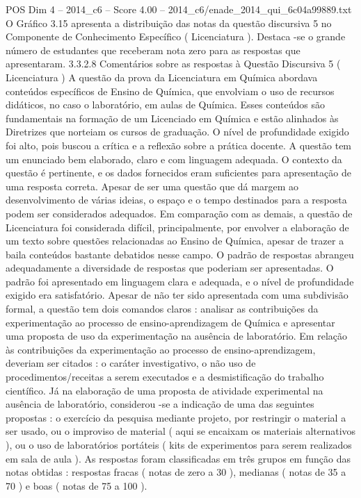 \begin{textsample}{POS Dim 4 – 2014\_c6 – Score 4.00 – 2014\_c6/enade\_2014\_qui\_6c04a99889.txt}
O Gráfico 3.15 apresenta a distribuição das notas da questão discursiva 5 no Componente de Conhecimento Específico ( Licenciatura ).
Destaca -se o grande número de estudantes que receberam nota zero para as respostas que apresentaram. 3.3.2.8 Comentários sobre as respostas à Questão Discursiva 5 ( Licenciatura ) A questão da prova da Licenciatura em Química abordava conteúdos específicos de Ensino de Química, que envolviam o uso de recursos didáticos, no caso o laboratório, em aulas de Química.
Esses conteúdos são fundamentais na formação de um Licenciado em Química e estão alinhados às Diretrizes que norteiam os cursos de graduação.
O nível de profundidade exigido foi alto, pois buscou a crítica e a reflexão sobre a prática docente.
A questão tem um enunciado bem elaborado, claro e com linguagem adequada.
O contexto da questão é pertinente, e os dados fornecidos eram suficientes para apresentação de uma resposta correta.
Apesar de ser uma questão que dá margem ao desenvolvimento de várias ideias, o espaço e o tempo destinados para a resposta podem ser considerados adequados.
Em comparação com as demais, a questão de Licenciatura foi considerada difícil, principalmente, por envolver a elaboração de um texto sobre questões relacionadas ao Ensino de Química, apesar de trazer a baila conteúdos bastante debatidos nesse campo.
O padrão de respostas abrangeu adequadamente a diversidade de respostas que poderiam ser apresentadas.
O padrão foi apresentado em linguagem clara e adequada, e o nível de profundidade exigido era satisfatório.
Apesar de não ter sido apresentada com uma subdivisão formal, a questão tem dois comandos claros : analisar as contribuições da experimentação ao processo de ensino-aprendizagem de Química e apresentar uma proposta de uso da experimentação na ausência de laboratório.
Em relação às contribuições da experimentação ao processo de ensino-aprendizagem, deveriam ser citados : o caráter investigativo, o não uso de procedimentos/receitas a serem executados e a desmistificação do trabalho científico.
Já na elaboração de uma proposta de atividade experimental na ausência de laboratório, considerou -se a indicação de uma das seguintes propostas : o exercício da pesquisa mediante projeto, por restringir o material a ser usado, ou o improviso de material ( aqui se encaixam os materiais alternativos ), ou o uso de laboratórios portáteis ( kits de experimentos para serem realizados em sala de aula ).
As respostas foram classificadas em três grupos em função das notas obtidas : respostas fracas ( notas de zero a 30 ), medianas ( notas de 35 a 70 ) e boas ( notas de 75 a 100 ).

\end{textsample}
